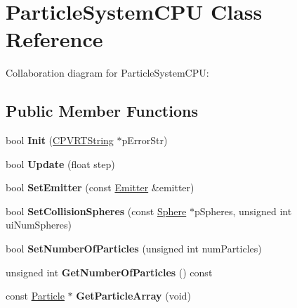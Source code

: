 \hypertarget{class_particle_system_c_p_u}{\section{Particle\+System\+C\+P\+U Class Reference}
\label{class_particle_system_c_p_u}
}


Collaboration diagram for Particle\+System\+C\+P\+U\+:
\subsection*{Public Member Functions}
\begin{DoxyCompactItemize}
\item 
\hypertarget{class_particle_system_c_p_u_a7e8adc33ea93a10c7d7721a1ba708283}{bool {\bfseries Init} (\hyperlink{class_c_p_v_r_t_string}{C\+P\+V\+R\+T\+String} $\ast$p\+Error\+Str)}\label{class_particle_system_c_p_u_a7e8adc33ea93a10c7d7721a1ba708283}

\item 
\hypertarget{class_particle_system_c_p_u_a4dd2059462d77ab7492f6cce5a27a088}{bool {\bfseries Update} (float step)}\label{class_particle_system_c_p_u_a4dd2059462d77ab7492f6cce5a27a088}

\item 
\hypertarget{class_particle_system_c_p_u_aa7a3f077504afa50d92a76099604c5fd}{bool {\bfseries Set\+Emitter} (const \hyperlink{struct_emitter}{Emitter} \&emitter)}\label{class_particle_system_c_p_u_aa7a3f077504afa50d92a76099604c5fd}

\item 
\hypertarget{class_particle_system_c_p_u_a4c0c40acc21619cf03ab16494d20f07c}{bool {\bfseries Set\+Collision\+Spheres} (const \hyperlink{class_sphere}{Sphere} $\ast$p\+Spheres, unsigned int ui\+Num\+Spheres)}\label{class_particle_system_c_p_u_a4c0c40acc21619cf03ab16494d20f07c}

\item 
\hypertarget{class_particle_system_c_p_u_a8f89cdd88ae2c41de09a0247f227929b}{bool {\bfseries Set\+Number\+Of\+Particles} (unsigned int num\+Particles)}\label{class_particle_system_c_p_u_a8f89cdd88ae2c41de09a0247f227929b}

\item 
\hypertarget{class_particle_system_c_p_u_a2fe6b3cc3c6e3e14bcf2acfd1081489d}{unsigned int {\bfseries Get\+Number\+Of\+Particles} () const }\label{class_particle_system_c_p_u_a2fe6b3cc3c6e3e14bcf2acfd1081489d}

\item 
\hypertarget{class_particle_system_c_p_u_a961ce98774f2810090a9cea9f233429a}{const \hyperlink{struct_particle}{Particle} $\ast$ {\bfseries Get\+Particle\+Array} (void)}\label{class_particle_system_c_p_u_a961ce98774f2810090a9cea9f233429a}

\end{DoxyCompactItemize}
